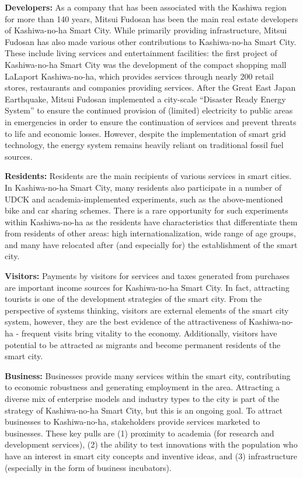 \documentclass[conference]{IEEEtran}
\begin{document}
\textbf{Developers:} As a company that has been associated with the Kashiwa region for more than 140 years, Mitsui Fudosan has been the main real estate developers of Kashiwa-no-ha Smart City. While primarily providing infrastructure, Mitsui Fudosan has also made various other contributions to Kashiwa-no-ha Smart City. These include living services and entertainment facilities: the first project of Kashiwa-no-ha Smart City was the development of the compact shopping mall LaLaport Kashiwa-no-ha, which provides services through nearly 200 retail stores, restaurants and companies providing services. After the Great East Japan Earthquake, Mitsui Fudosan implemented a city-scale ``Disaster Ready Energy System'' to ensure the continued provision of (limited) electricity to public areas in emergencies in order to ensure the continuation of services and prevent threats to life and economic losses. However, despite the implementation of smart grid technology, the energy system remains heavily reliant on traditional fossil fuel sources.

\textbf{Residents:} Residents are the main recipients of various services in smart cities. In Kashiwa-no-ha Smart City, many residents also participate in a number of UDCK and academia-implemented experiments, such as the above-mentioned bike and car sharing schemes. There is a rare opportunity for such experiments within Kashiwa-no-ha as the residents have characteristics that differentiate them from residents of other areas: high internationalization, wide range of age groups, and many have relocated after (and especially for) the establishment of the smart city.

\textbf{Visitors:} Payments by visitors for services and taxes generated from purchases are important income sources for Kashiwa-no-ha Smart City. In fact, attracting tourists is one of the development strategies of the smart city. From the perspective of systems thinking, visitors are external elements of the smart city system, however, they are the best evidence of the attractiveness of Kashiwa-no-ha - frequent visits bring vitality to the economy. Additionally, visitors have potential to be attracted as migrants and become permanent residents of the smart city.

\textbf{Business:} Businesses provide many services within the smart city, contributing to economic robustness and generating employment in the area. Attracting a diverse mix of enterprise models and industry types to the city is part of the strategy of Kashiwa-no-ha Smart City, but this is an ongoing goal. To attract businesses to Kashiwa-no-ha, stakeholders provide services marketed to businesses. These key pulls are (1) proximity to academia (for research and development services), (2) the ability to test innovations with the population who have an interest in smart city concepts and inventive ideas, and (3) infrastructure (especially in the form of business incubators).
\end{document}

